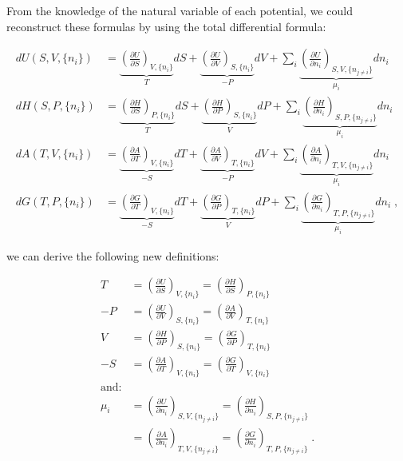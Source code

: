\documentclass[
]{book}
\theoremstyle{definition}
\theoremstyle{definition}
\theoremstyle{definition}
\theoremstyle{remark}
\begin{document}
From the knowledge of the natural variable of each potential, we could reconstruct these formulas by using the total differential formula:

\begin{equation}
\begin{aligned}
dU(S,V,\{n_i\}) &= \underbrace{\left(\frac{\partial U}{\partial S} \right)_{V,\{n_i\}}}_{T} dS + \underbrace{\left(\frac{\partial U}{\partial V} \right)_{S,\{n_i\}}}_{-P} dV + \sum_i \underbrace{\left(\frac{\partial U}{\partial n_i} \right)_{S,V,\{n_{j \neq i}\}}}_{\mu_i} dn_i \\
dH(S,P,\{n_i\}) &= \underbrace{\left(\frac{\partial H}{\partial S} \right)_{P,\{n_i\}}}_{T} dS + \underbrace{\left(\frac{\partial H}{\partial P} \right)_{S,\{n_i\}}}_{V} dP + \sum_i \underbrace{\left(\frac{\partial H}{\partial n_i} \right)_{S,P,\{n_{j \neq i}\}}}_{\mu_i} dn_i \\
dA(T,V,\{n_i\}) &= \underbrace{\left(\frac{\partial A}{\partial T} \right)_{V,\{n_i\}}}_{-S} dT + \underbrace{\left(\frac{\partial A}{\partial V} \right)_{T,\{n_i\}}}_{-P} dV + \sum_i \underbrace{\left(\frac{\partial A}{\partial n_i} \right)_{T,V,\{n_{j \neq i}\}}}_{\mu_i} dn_i \\
dG(T,P,\{n_i\}) &= \underbrace{\left(\frac{\partial G}{\partial T} \right)_{V,\{n_i\}}}_{-S} dT + \underbrace{\left(\frac{\partial G}{\partial P} \right)_{T,\{n_i\}}}_{V} dP + \sum_i \underbrace{\left(\frac{\partial G}{\partial n_i} \right)_{T,P,\{n_{j \neq i}\}}}_{\mu_i} dn_i\;,
\end{aligned}
\label{eq:dhagchem2}
\end{equation}

we can derive the following new definitions:

\begin{equation}
\begin{aligned}
 T &= \left(\frac{\partial U}{\partial S} \right)_{V,\{n_i\}} = \left(\frac{\partial H}{\partial S} \right)_{P,\{n_i\}}  \\
-P &= \left(\frac{\partial U}{\partial V} \right)_{S,\{n_i\}} = \left(\frac{\partial A}{\partial V} \right)_{T,\{n_i\}}  \\
 V &= \left(\frac{\partial H}{\partial P} \right)_{S,\{n_i\}} = \left(\frac{\partial G}{\partial P} \right)_{T,\{n_i\}}  \\
-S &= \left(\frac{\partial A}{\partial T} \right)_{V,\{n_i\}} = \left(\frac{\partial G}{\partial T} \right)_{V,\{n_i\}}  \\
\text{and:}
\\
 \mu_i &=  \left(\frac{\partial U}{\partial n_i} \right)_{S,V,\{n_{j \neq i}\}} =  \left(\frac{\partial H}{\partial n_i} \right)_{S,P,\{n_{j \neq i}\}} \\
       &= \left(\frac{\partial A}{\partial n_i} \right)_{T,V,\{n_{j \neq i}\}} = \left(\frac{\partial G}{\partial n_i} \right)_{T,P,\{n_{j \neq i}\}}\;.
\end{aligned}
\label{eq:dhagchem3}
\end{equation}
\end{document}
